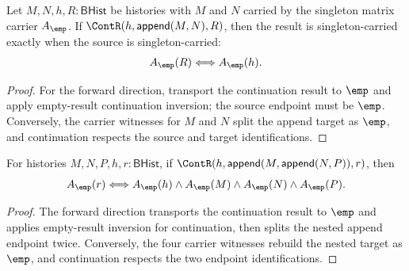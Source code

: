 \begin{theorem}
\label{thm:matrix-singleton-carrier-continuation-append-target-result-iff}
Let \(M,N,h,R:\mathsf{BHist}\) be histories with \(M\) and \(N\) carried by the
singleton matrix carrier \(A_{\emp}\). If
\(\ContR(h,\mathsf{append}(M,N),R)\), then the result is singleton-carried
exactly when the source is singleton-carried:
$$
A_{\emp}(R)\Longleftrightarrow A_{\emp}(h).
$$
\end{theorem}
\begin{proof}
For the forward direction, transport the continuation result to \(\emp\) and
apply empty-result continuation inversion; the source endpoint must be
\(\emp\). Conversely, the carrier witnesses for \(M\) and \(N\) split the
append target as \(\emp\), and continuation respects the source and target
identifications.
\end{proof}

\begin{theorem}
\label{thm:matrix-singleton-nested-append-target-continuation-result-iff}
For histories $M,N,P,h,r:\mathsf{BHist}$, if
$\ContR(h,\mathsf{append}(M,\mathsf{append}(N,P)),r)$, then
$$
A_{\emp}(r)\Longleftrightarrow
A_{\emp}(h)\land A_{\emp}(M)\land A_{\emp}(N)\land A_{\emp}(P).
$$
\end{theorem}
\begin{proof}
The forward direction transports the continuation result to $\emp$ and applies
empty-result inversion for continuation, then splits the nested append endpoint
twice. Conversely, the four carrier witnesses rebuild the nested target as
$\emp$, and continuation respects the two endpoint identifications.
\end{proof}
